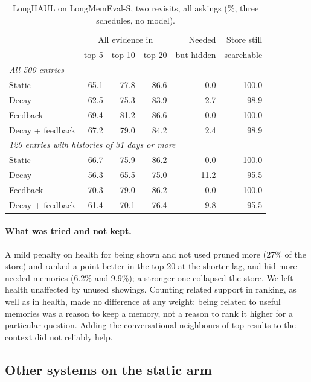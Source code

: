 \documentclass[11pt]{article}
\begin{document}
\begin{table}[t]
\centering
\small
\begin{tabular}{lrrrrr}
\toprule
 & \multicolumn{3}{c}{All evidence in} & Needed & Store still \\
 & top 5 & top 10 & top 20 & but hidden & searchable \\
\midrule
\multicolumn{6}{l}{\emph{All 500 entries}} \\
Static & 65.1 & 77.8 & 86.6 & 0.0 & 100.0 \\
Decay & 62.5 & 75.3 & 83.9 & 2.7 & 98.9 \\
Feedback & 69.4 & 81.2 & 86.6 & 0.0 & 100.0 \\
Decay + feedback & 67.2 & 79.0 & 84.2 & 2.4 & 98.9 \\
\midrule
\multicolumn{6}{l}{\emph{120 entries with histories of 31 days or more}} \\
Static & 66.7 & 75.9 & 86.2 & 0.0 & 100.0 \\
Decay & 56.3 & 65.5 & 75.0 & 11.2 & 95.5 \\
Feedback & 70.3 & 79.0 & 86.2 & 0.0 & 100.0 \\
Decay + feedback & 61.4 & 70.1 & 76.4 & 9.8 & 95.5 \\
\bottomrule
\end{tabular}
\caption{LongHAUL on LongMemEval-S, two revisits, all
askings (\%, three schedules, no model).}
\label{tab:lme}
\end{table}

\paragraph{What was tried and not kept.} A mild penalty on health for
being shown and not used pruned more (27\% of the store) and ranked a
point better in the top 20 at the shorter lag, and hid more needed
memories (6.2\% and 9.9\%); a stronger one collapsed the store. We
left health unaffected by unused showings. Counting related support in
ranking, as well as in health, made no difference at any weight: being
related to useful memories was a reason to keep a memory, not a reason
to rank it higher for a particular question. Adding the conversational
neighbours of top results to the context did not reliably help.

\subsection{Other systems on the static arm}
\label{sec:others}
\end{document}
